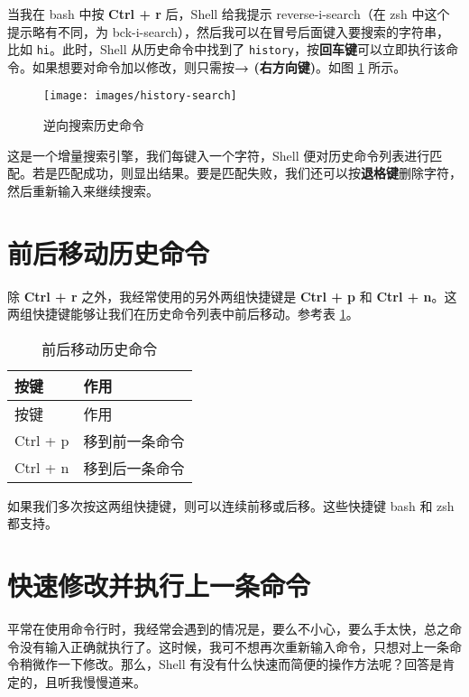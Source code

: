 \documentclass[]{ctexbook}
\begin{document}
当我在 bash 中按 \textbf{Ctrl + r} 后，Shell 给我提示 reverse-i-search（在 zsh 中这个提示略有不同，为 bck-i-search），然后我可以在冒号后面键入要搜索的字符串，比如 \texttt{hi}。此时，Shell 从历史命令中找到了 \texttt{history}，按\textbf{回车键}可以立即执行该命令。如果想要对命令加以修改，则只需按\textbf{→️ (右方向键)}。如图 \ref{fig:history-search} 所示。

\begin{figure}
\texttt{[image: images/history-search]} \caption{逆向搜索历史命令}\label{fig:history-search}
\end{figure}

这是一个增量搜索引擎，我们每键入一个字符，Shell 便对历史命令列表进行匹配。若是匹配成功，则显出结果。要是匹配失败，我们还可以按\textbf{退格键}删除字符，然后重新输入来继续搜索。

\hypertarget{ux524dux540eux79fbux52a8ux5386ux53f2ux547dux4ee4}{%
\section{前后移动历史命令}\label{ux524dux540eux79fbux52a8ux5386ux53f2ux547dux4ee4}}

除 \textbf{Ctrl + r} 之外，我经常使用的另外两组快捷键是 \textbf{Ctrl + p} 和 \textbf{Ctrl + n}。这两组快捷键能够让我们在历史命令列表中前后移动。参考表 \ref{tab:move-history}。

\begin{longtable}[]{@{}ll@{}}
\caption{\label{tab:move-history} 前后移动历史命令}\tabularnewline
\toprule
按键 & 作用\tabularnewline
\midrule
\endfirsthead
\toprule
按键 & 作用\tabularnewline
\midrule
\endhead
Ctrl + p & 移到前一条命令\tabularnewline
Ctrl + n & 移到后一条命令\tabularnewline
\bottomrule
\end{longtable}

如果我们多次按这两组快捷键，则可以连续前移或后移。这些快捷键 bash 和 zsh 都支持。

\hypertarget{ux5febux901fux4feeux6539ux5e76ux6267ux884cux4e0aux4e00ux6761ux547dux4ee4}{%
\section{快速修改并执行上一条命令}\label{ux5febux901fux4feeux6539ux5e76ux6267ux884cux4e0aux4e00ux6761ux547dux4ee4}}

平常在使用命令行时，我经常会遇到的情况是，要么不小心，要么手太快，总之命令没有输入正确就执行了。这时候，我可不想再次重新输入命令，只想对上一条命令稍微作一下修改。那么，Shell 有没有什么快速而简便的操作方法呢？回答是肯定的，且听我慢慢道来。
\end{document}
